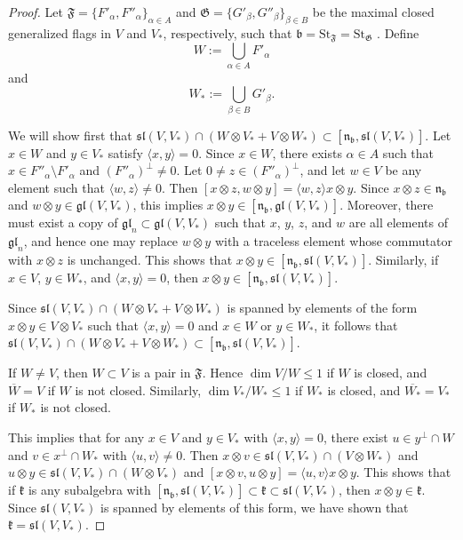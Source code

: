 \documentclass{article}
\newcommand {\St} {\mathrm{St}}
\def\b{\mathfrak {b}}
\def\gl{\mathfrak {gl}}
\def\n{\mathfrak {n}}
\def\sl{\mathfrak{sl}}
\def\k{\mathfrak{k}}
\def\F{\mathfrak{F}}
\def\G{\mathfrak{G}}
\begin{document}
\begin{proof}
Let $\F = \{F'_\alpha, F''_\alpha \}_{\alpha \in A}$ and $\G = \{ G'_\beta , G''_\beta \}_{\beta \in B}$ be the maximal closed generalized flags in $V$ and $V_*$, respectively, such that $\b = \St_\F = \St_\G$ \cite{DP2}.
Define 
$$W := \bigcup_{\alpha \in A} F'_\alpha$$
and
$$W_* := \bigcup_{\beta \in B} G'_\beta.$$

We will show first that $\sl(V,V_*) \cap (W \otimes V_* + V \otimes W_*) \subset [\n_\b , \sl(V,V_*)]$.  Let $x \in W$ and $y \in V_*$ satisfy $\langle x,y \rangle = 0$.  Since $x \in W$, there exists $\alpha \in A$ such that $x \in F''_\alpha \setminus F'_\alpha$ and $(F''_\alpha)^\perp \neq 0$.  Let $0 \neq z \in (F''_\alpha)^\perp$, and let $w \in V$ be any element such that $\langle w, z \rangle \neq 0$.  Then $[ x \otimes z, w \otimes y] =  \langle w , z \rangle x \otimes y$.  Since $x \otimes z \in \n_\b$ and $w \otimes y  \in \gl(V,V_*)$, this implies $x \otimes y \in [\n_\b , \gl(V,V_*)]$.  Moreover, there must exist a copy of $\gl_n \subset \gl(V,V_*)$ such that $x$, $y$, $z$, and $w$ are all elements of $\gl_n$, and hence one may replace $w \otimes y$ with a traceless element whose commutator with $x \otimes z$ is unchanged.  This shows that  $x \otimes y \in [\n_\b , \sl(V,V_*)]$.
Similarly, if $x \in V$, $y \in W_*$, and $\langle x,y \rangle = 0$, then $x \otimes y \in [\n_\b , \sl(V,V_*)]$.  

Since $\sl(V,V_*) \cap (W \otimes V_* + V \otimes W_*)$ is spanned by elements of the form $x \otimes y \in V \otimes V_*$ such that $\langle x, y \rangle = 0$ and $x \in W$ or $y \in W_*$, it follows that $\sl(V,V_*) \cap (W \otimes V_* + V \otimes W_*) \subset [\n_\b , \sl(V,V_*)]$. 

If $W \neq V$, then $W \subset V$ is a pair in $\F$.  Hence $\dim V/ W \leq 1$ if $W$ is closed, and $\overline{W} = V$ if $W$ is not closed.  Similarly,  $\dim V_* / W_* \leq 1$ if $W_*$ is closed, and $\overline{W_*} = V_*$ if $W_*$ is not closed.  

This implies that for any $x \in V$ and $y \in V_*$ with $\langle x , y \rangle = 0$, there exist $u \in y^\perp \cap W$ and $v \in x^\perp \cap W_*$ with $\langle u , v \rangle \neq 0$.  Then $x \otimes v \in \sl(V,V_*) \cap (V \otimes W_*)$ and $u \otimes y \in \sl(V,V_*) \cap (W \otimes V_*)$ and $[x \otimes v, u \otimes y] = \langle u , v \rangle x \otimes y$.  This shows that if $\k$ is any subalgebra with $[\n_\b , \sl(V,V_*)] \subset \k \subset \sl(V,V_*)$, then
 $x \otimes y \in \k$. Since $\sl(V,V_*)$ is spanned by elements of this form, we have shown that $\k = \sl(V,V_*)$.
\end{proof}
\end{document}

